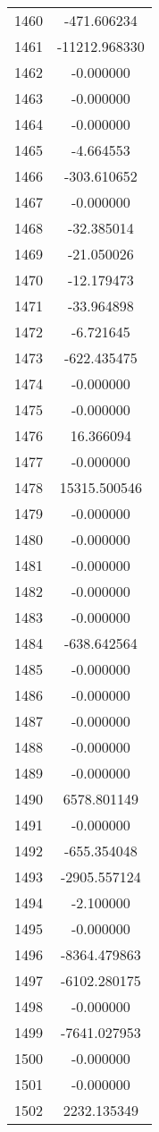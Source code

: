 \documentclass[12pt]{article}
\begin{document}
\begin{longtable}{@{}cc@{}}
1460 & -471.606234 \\
1461 & -11212.968330 \\
1462 & -0.000000 \\
1463 & -0.000000 \\
1464 & -0.000000 \\
1465 & -4.664553 \\
1466 & -303.610652 \\
1467 & -0.000000 \\
1468 & -32.385014 \\
1469 & -21.050026 \\
1470 & -12.179473 \\
1471 & -33.964898 \\
1472 & -6.721645 \\
1473 & -622.435475 \\
1474 & -0.000000 \\
1475 & -0.000000 \\
1476 & 16.366094 \\
1477 & -0.000000 \\
1478 & 15315.500546 \\
1479 & -0.000000 \\
1480 & -0.000000 \\
1481 & -0.000000 \\
1482 & -0.000000 \\
1483 & -0.000000 \\
1484 & -638.642564 \\
1485 & -0.000000 \\
1486 & -0.000000 \\
1487 & -0.000000 \\
1488 & -0.000000 \\
1489 & -0.000000 \\
1490 & 6578.801149 \\
1491 & -0.000000 \\
1492 & -655.354048 \\
1493 & -2905.557124 \\
1494 & -2.100000 \\
1495 & -0.000000 \\
1496 & -8364.479863 \\
1497 & -6102.280175 \\
1498 & -0.000000 \\
1499 & -7641.027953 \\
1500 & -0.000000 \\
1501 & -0.000000 \\
1502 & 2232.135349 \\

\end{longtable}
\end{document}
